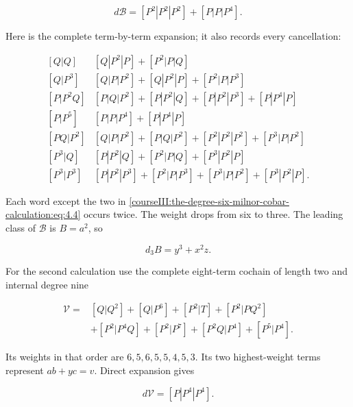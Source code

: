 \begin{equation}
d\mathcal B=[P^2|P^2|P^2]+[P|P|P^4].
 \label{courseIII:the-degree-six-milnor-cobar-calculation:eq:4.4}
\end{equation}

Here is the complete term-by-term expansion; it also records every cancellation:

\begin{equation}
\begin{array}{c|l}
[Q|Q]&[Q|P^2|P]+[P^2|P|Q]\\
{}[Q|P^3]&[Q|P|P^2]+[Q|P^2|P]+[P^2|P|P^3]\\
{}[P|P^2Q]&[P|Q|P^2]+[P|P^2|Q]+[P|P^2|P^3]+[P|P^4|P]\\
{}[P|P^5]&[P|P|P^4]+[P|P^4|P]\\
{}[PQ|P^2]&[Q|P|P^2]+[P|Q|P^2]+[P^2|P^2|P^2]+[P^3|P|P^2]\\
{}[P^3|Q]&[P|P^2|Q]+[P^2|P|Q]+[P^3|P^2|P]\\
{}[P^3|P^3]&[P|P^2|P^3]+[P^2|P|P^3]+[P^3|P|P^2]+[P^3|P^2|P].
\end{array}
\label{courseIII:the-degree-six-milnor-cobar-calculation:eq:4.5}
\end{equation}

Each word except the two in \eqref{courseIII:the-degree-six-milnor-cobar-calculation:eq:4.4} occurs twice. The weight drops from six to three. The leading class of \(\mathcal B\) is \(B=a^2\), so

\begin{equation}
d_3B=y^3+x^2z.
 \label{courseIII:the-degree-six-milnor-cobar-calculation:eq:4.6}
\end{equation}

For the second calculation use the complete eight-term cochain of length two and internal degree nine

\begin{equation}
\begin{aligned}
 \mathcal V={}&[Q|Q^2]+[Q|P^6]+[P^2|T]+[P^2|PQ^2]\\
              &+[P^2|P^4Q]+[P^2|P^7]
                +[P^2Q|P^4]+[P^5|P^4].
\end{aligned}
\label{courseIII:the-degree-six-milnor-cobar-calculation:eq:4.7}
\end{equation}

Its weights in that order are \(6,5,6,5,5,4,5,3\). Its two highest-weight terms represent \(ab+yc=v\). Direct expansion gives

\begin{equation}
d\mathcal V=[P|P^4|P^4].
 \label{courseIII:the-degree-six-milnor-cobar-calculation:eq:4.8}
\end{equation}

